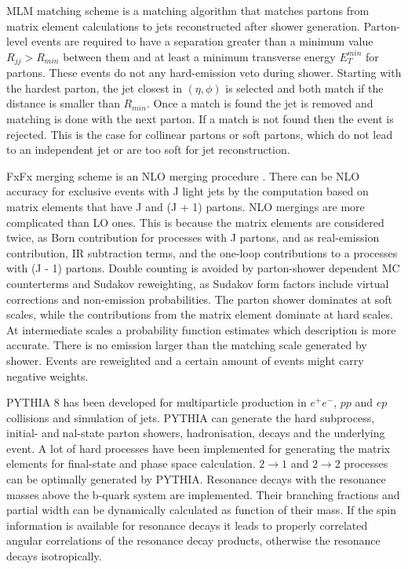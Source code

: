 MLM matching scheme is a matching algorithm \cite{Mangano:2001xp, Mangano:2002ea} that matches partons from matrix element calculations to jets reconstructed after shower generation. Parton-level events are required to have a separation greater than a minimum value $R_{jj} > R_{min}$ between them and at least a minimum transverse energy $E^{min}_{T}$ for partons. These events do not any hard-emission veto during shower. Starting with the hardest parton, the jet closest in $(\eta, \phi)$ is selected and both match if the distance is smaller than $R_{min}$. Once a match is found the jet is removed and matching is done with the next parton. If a match is not found then the event is rejected. This is the case for collinear partons or soft partons, which do not lead to an independent jet or are too soft for jet reconstruction.

FxFx merging scheme is an NLO merging procedure \cite{Frederix:2012ps}. There can be NLO accuracy for exclusive events with J light jets by the computation based on matrix elements that have J and (J + 1) partons. NLO mergings are more complicated than LO ones. This is because the matrix elements are considered twice, as Born contribution for processes with J partons, and as real-emission contribution, IR subtraction terms, and the one-loop contributions to a processes with (J - 1) partons. Double counting is avoided by parton-shower dependent MC counterterms and Sudakov reweighting, as Sudakov form factors include virtual corrections and non-emission probabilities. The parton shower dominates at soft scales, while the contributions from the matrix element dominate at hard scales. At intermediate scales a probability function estimates which description is more accurate. There is no emission larger than the matching scale generated by shower. Events are reweighted and a certain amount of events might carry negative weights.

PYTHIA 8 has been developed for multiparticle production in $e^{+}e^{-}$, $pp$ and $ep$ collisions and simulation of jets. PYTHIA can generate the hard subprocess, initial- andnal-state parton showers, hadronisation, decays and the underlying event. A lot of hard processes have been implemented for generating the matrix elements for final-state and phase space calculation. $2 \to 1$ and $2 \to 2$ processes can be optimally generated by PYTHIA. Resonance decays with the resonance masses above the b-quark system are implemented. Their branching fractions and partial width can be dynamically calculated as function of their mass. If the spin information is available for resonance decays it leads to properly correlated angular correlations of the resonance decay products, otherwise the resonance decays isotropically.

